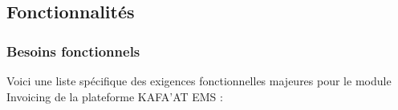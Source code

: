 \documentclass[12pt, a4paper, openany]{report}
\begin{document}
\vspace{-0.4cm}

\subsection{Fonctionnalités}

\vspace{-0.5cm}
\subsubsection{Besoins fonctionnels}

\vspace{-0.4cm}
Voici une liste spécifique des exigences fonctionnelles majeures pour le module Invoicing de la plateforme KAFA'AT EMS :

\vspace{-0.4cm}
\end{document}
